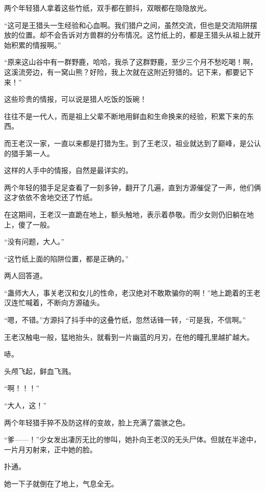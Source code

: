 
\begin{this_body}



两个年轻猎人拿着这些竹纸，双手都在颤抖，双眼都在隐隐放光。

“这可是王猎头一生经验和心血啊。我们猎户之间，虽然交流，但也是交流陷阱摆放的位置。却不会告诉对方兽群的分布情况。这竹纸上的，都是王猎头从祖上就开始积累的情报啊。”

“原来这山谷中有一群野鹿，哈哈，我杀了这群野鹿，至少三个月不愁吃喝！啊，这溪流旁边，有一窝山熊？好险，我上次就在这附近狩猎的。记下来，都要记下来！”

这些珍贵的情报，可以说是猎人吃饭的饭碗！

往往不是一代人，而是祖上父辈不断地用鲜血和生命换来的经验，积累下来的东西。

而王老汉一家，一直以来都是打猎为生。到了王老汉，祖业就达到了巅峰，是公认的猎手第一人。

这样的人手中的情报，自然是最详实的。

两个年轻的猎手足足查看了一刻多钟，翻开了几遍，直到方源催促了一声，他们俩这才依依不舍地交还了竹纸。

在这期间，王老汉一直跪在地上，额头触地，表示着恭敬。而少女则仍旧躺在地上，傻了一般。

“没有问题，大人。”

“这竹纸上面的陷阱位置，都是正确的。”

两人回答道。

“蛊师大人，事关老汉和女儿的性命，老汉绝对不敢欺骗你的啊！”地上跪着的王老汉连忙喊着，不断向方源磕头。

“嗯，不错。”方源抖了抖手中的这叠竹纸，忽然话锋一转，“可是我，不信啊。”

王老汉触电一般，猛地抬头，就看到一片幽蓝的月刃，在他的瞳孔里越扩越大。

哧。

头颅飞起，鲜血飞溅。

“啊！！！”

“大人，这！”

两个年轻猎手猝不及防这样的变故，脸上充满了震骇之色。

“爹——！”少女发出凄厉无比的惨叫，她扑向王老汉的无头尸体。但就在半途中，一片月刃射来，正中她的脸。

扑通。

她一下子就倒在了地上，气息全无。


\end{this_body}
